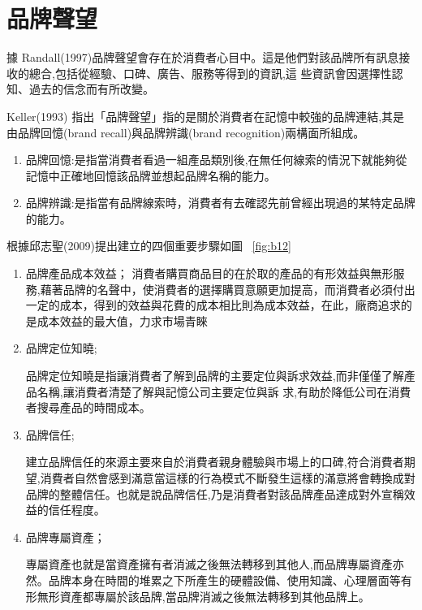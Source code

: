 \section{品牌聲望}
據
Randall(1997)品牌聲望會存在於消費者心目中。這是他們對該品牌所有訊息接收的總合,包括從經驗、口碑、廣告、服務等得到的資訊,這 些資訊會因選擇性認知、過去的信念而有所改變。\cite{Randall1997}

Keller(1993) 指出「品牌聲望」指的是關於消費者在記憶中較強的品牌連結,其是由品牌回憶(brand recall)與品牌辨識(brand recognition)兩構面所組成\cite{Keller1993}。
\begin{enumerate}
\item 品牌回憶:是指當消費者看過一組產品類別後,在無任何線索的情況下就能夠從記憶中正確地回憶該品牌並想起品牌名稱的能力。

\item 品牌辨識:是指當有品牌線索時，消費者有去確認先前曾經出現過的某特定品牌的能力。
\end{enumerate}

根據邱志聖(2009)提出建立的四個重要步驟如圖 ~\ref{fig:b12}
\begin{enumerate}
\item 品牌產品成本效益；
消費者購買商品目的在於取的產品的有形效益與無形服務,藉著品牌的名聲中，使消費者的選擇購買意願更加提高，而消費者必須付出一定的成本，得到的效益與花費的成本相比則為成本效益，在此，廠商追求的是成本效益的最大值，力求市場青睞

\item  品牌定位知曉;

品牌定位知曉是指讓消費者了解到品牌的主要定位與訴求效益,而非僅僅了解產品名稱,讓消費者清楚了解與記憶公司主要定位與訴 求,有助於降低公司在消費者搜尋產品的時間成本。

\item  品牌信任;

建立品牌信任的來源主要來自於消費者親身體驗與市場上的口碑,符合消費者期望,消費者自然會感到滿意當這樣的行為模式不斷發生這樣的滿意將會轉換成對品牌的整體信任。也就是說品牌信任,乃是消費者對該品牌產品達成對外宣稱效益的信任程度。

\item  品牌專屬資產；

專屬資產也就是當資產擁有者消滅之後無法轉移到其他人,而品牌專屬資產亦然。品牌本身在時間的堆累之下所產生的硬體設備、使用知識、心理層面等有形無形資產都專屬於該品牌,當品牌消滅之後無法轉移到其他品牌上。
\end{enumerate}


